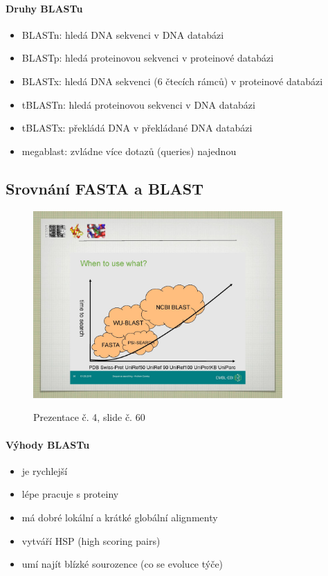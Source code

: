 \documentclass[DIV=8]{scrreprt}
\begin{document}
\paragraph{Druhy BLASTu}
\begin{itemize}[nosep]
    \item BLASTn: hledá DNA sekvenci v DNA databázi
    \item BLASTp: hledá proteinovou sekvenci v proteinové databázi
    \item BLASTx: hledá DNA sekvenci (6 čtecích rámců) v proteinové databázi
    \item tBLASTn: hledá proteinovou sekvenci v DNA databázi
    \item tBLASTx: překládá DNA v překládané DNA databázi
    \item megablast: zvládne více dotazů (queries) najednou
\end{itemize}



\subsection{Srovnání FASTA a BLAST} \label{Srovnání FASTA a BLAST}


\begin{figure}
    \caption{Prezentace č. 4, slide č. 60}
    \includegraphics[width=0.85\textwidth]{slides-4/slide-60.jpg}
    \centering
    \label{slides-4-slide-60}
\end{figure}

\paragraph{Výhody BLASTu}
\begin{itemize}[nosep]
    \item je rychlejší
    \item lépe pracuje s proteiny
    \item má dobré lokální a krátké globální alignmenty
    \item vytváří HSP (high scoring pairs)
    \item umí najít blízké sourozence (co se evoluce týče)
\end{itemize}
\end{document}
